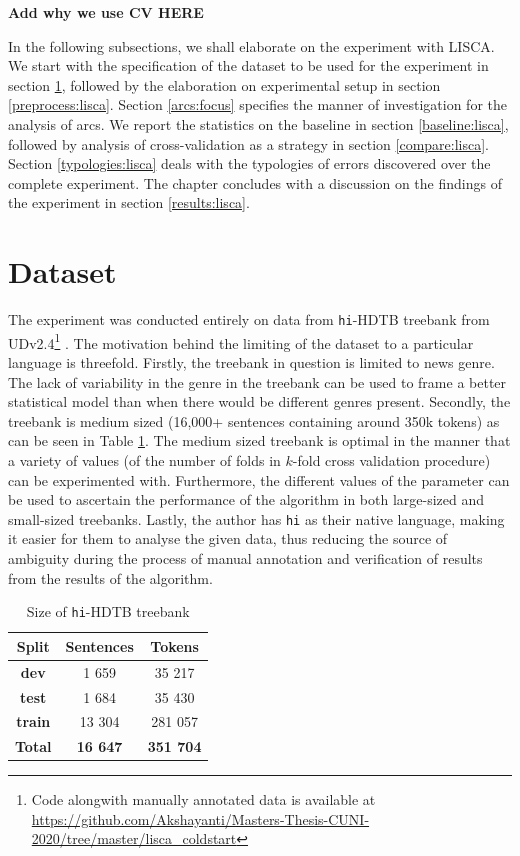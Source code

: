 \textbf{Add why we use CV HERE}

In the following subsections, we shall elaborate on the experiment with LISCA. We start with the specification of the dataset to be used for the experiment in section \ref{data:lisca}, followed by the elaboration on experimental setup in section \ref{preprocess:lisca}. Section \ref{arcs:focus} specifies the manner of investigation for the analysis of arcs. We report the statistics on the baseline in section \ref{baseline:lisca}, followed by analysis of cross-validation as a strategy in section \ref{compare:lisca}. Section \ref{typologies:lisca} deals with the typologies of errors discovered over the complete experiment. The chapter concludes with a discussion on the findings of the experiment in section \ref{results:lisca}.

\section{Dataset}
\label{data:lisca}

The experiment was conducted entirely on data from \verb|hi|-HDTB treebank from UDv2.4\footnote{Code alongwith manually annotated data is available at \url{https://github.com/Akshayanti/Masters-Thesis-CUNI-2020/tree/master/lisca_coldstart}} \citep{UDv2.4}. The motivation behind the limiting of the dataset to a particular language is threefold. Firstly, the treebank in question is limited to news genre. The lack of variability in the genre in the treebank can be used to frame a better statistical model than when there would be different genres present. Secondly, the treebank is medium sized (16,000+ sentences containing around 350k tokens) as can be seen in Table \ref{tab:hi_size2}. The medium sized treebank is optimal in the manner that a variety of values (of the number of folds in \(k\)-fold cross validation procedure) can be experimented with. Furthermore, the different values of the parameter can be used to ascertain the performance of the algorithm in both large-sized and small-sized treebanks. Lastly, the author has \verb|hi| as their native language, making it easier for them to analyse the given data, thus reducing the source of ambiguity during the process of manual annotation and verification of results from the results of the algorithm.

\begin{table}[h]
    \centering
    \begin{tabular}{|c|c|c|}
    \hline
    \textbf{Split} & \textbf{Sentences} & \textbf{Tokens}\\
    \hline
    \hline
    \textbf{dev} & 1 659 & 35 217\\
    \textbf{test} & 1 684 & 35 430\\
    \textbf{train} & 13 304 & 281 057\\
    \hline
    \hline
    \textbf{Total} & \textbf{16 647} & \textbf{351 704}\\
    \hline
    \end{tabular}
    \caption{Size of \texttt{hi}-HDTB treebank}
    \label{tab:hi_size2}
\end{table}

